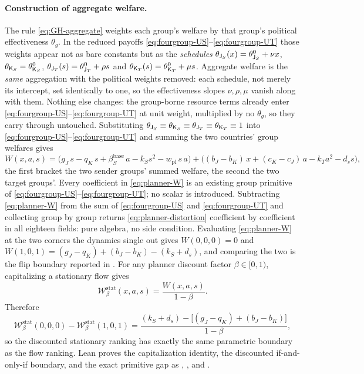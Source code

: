 \paragraph{Construction of aggregate welfare.}
The \citet{GrossmanHelpman1994} rule \eqref{eq:GH-aggregate} weights each
group's welfare by that group's political effectiveness $\theta_g$. In the
reduced payoffs \eqref{eq:fourgroup-US}--\eqref{eq:fourgroup-UT} those
weights appear not as bare constants but as the \emph{schedules}
$\theta_{\mathsf{J}_S}(x)=\theta^0_{\mathsf{J}_S}+\nu x$,
$\theta_{\mathsf{K}_S}=\theta^0_{\mathsf{K}_S}$,
$\theta_{\mathsf{J}_T}(s)=\theta^0_{\mathsf{J}_T}+\rho s$ and
$\theta_{\mathsf{K}_T}(s)=\theta^0_{\mathsf{K}_T}+\mu s$. Aggregate welfare is the \emph{same}
aggregation with the political weights removed: each schedule, not
merely its intercept, set identically to one, so the effectiveness
slopes $\nu,\rho,\mu$ vanish along with them. Nothing else
changes: the group-borne resource terms already enter
\eqref{eq:fourgroup-US}--\eqref{eq:fourgroup-UT} at unit weight,
multiplied by no $\theta_g$, so they carry through untouched. Substituting
$\theta_{\mathsf{J}_S}\equiv\theta_{\mathsf{K}_S}\equiv
\theta_{\mathsf{J}_T}\equiv\theta_{\mathsf{K}_T}\equiv1$
into \eqref{eq:fourgroup-US}--\eqref{eq:fourgroup-UT} and summing the two
countries' group welfares gives
\begin{equation}
W(x,a,s)
=\bigl(g_J\,s-q_K\,s+\beta^{\mathrm{base}}_S\,a-k_S s^2
        -w_{\mathrm{pl}}\,s\,a\bigr)
+\bigl((b_J-b_K)\,x+(c_K-c_J)\,a-k_T a^2-d_s s\bigr),
\label{eq:planner-W}
\end{equation}
the first bracket the two sender groups' summed welfare, the second the
two target groups'. Every coefficient in \eqref{eq:planner-W} is an
existing group primitive of
\eqref{eq:fourgroup-US}--\eqref{eq:fourgroup-UT}; no scalar is introduced.
Subtracting \eqref{eq:planner-W} from the sum of \eqref{eq:fourgroup-US}
and \eqref{eq:fourgroup-UT} and collecting group by group returns
\eqref{eq:planner-distortion} coefficient by coefficient in all eighteen
fields: pure algebra, no side condition. Evaluating
\eqref{eq:planner-W} at the two corners the dynamics single out gives
$W(0,0,0)=0$ and $W(1,0,1)=(g_J-q_K)+(b_J-b_K)-(k_S+d_s)$, and comparing
the two is the flip boundary reported in .
For any planner discount factor $\beta\in[0,1)$, capitalizing a
stationary flow gives
\[
\mathcal W_\beta^{\mathrm{stat}}(x,a,s)
=\frac{W(x,a,s)}{1-\beta}.
\]
Therefore
\[
\mathcal W_\beta^{\mathrm{stat}}(0,0,0)
-\mathcal W_\beta^{\mathrm{stat}}(1,0,1)
=
\frac{(k_S+d_s)-\bigl[(g_J-q_K)+(b_J-b_K)\bigr]}
     {1-\beta},
\]
so the discounted stationary ranking has exactly the same parametric
boundary as the flow ranking. Lean proves the capitalization identity,
the discounted if-and-only-if boundary, and the exact primitive gap as
,
, and
.

